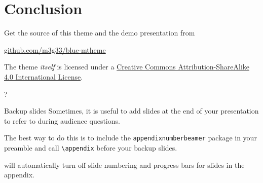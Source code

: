 \documentclass[10pt,aspectratio=169,english]{beamer}
\begin{document}
\section{Conclusion}

\begin{frame}{}

  Get the source of this theme and the demo presentation from

  \begin{center}\url{github.com/m3g33/blue-mtheme}\end{center}

  The theme \emph{itself} is licensed under a
  \href{http://creativecommons.org/licenses/by-sa/4.0/}{Creative Commons
  Attribution-ShareAlike 4.0 International License}.

  \begin{center}\ccbysa\end{center}

\end{frame}

\begin{frame}[standout]
  ?
\end{frame}

\appendix

\begin{frame}[fragile]{Backup slides}
  Sometimes, it is useful to add slides at the end of your presentation to
  refer to during audience questions.

  The best way to do this is to include the \verb|appendixnumberbeamer|
  package in your preamble and call \verb|\appendix| before your backup slides.

  \themename will automatically turn off slide numbering and progress bars for
  slides in the appendix.
\end{frame}

\begin{frame}[allowframebreaks]{}

  
  

\end{frame}
\end{document}

